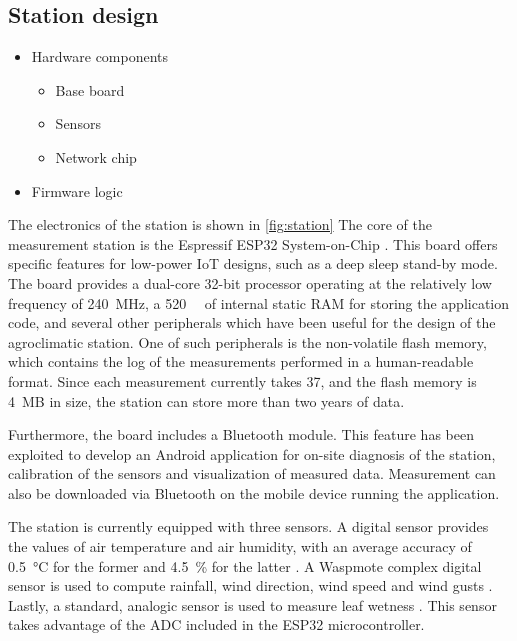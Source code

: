 \documentclass[authoryear,preprint,review,12pt]{elsarticle}
\begin{document}
\subsection{Station design}

\begin{itemize}
    \item Hardware components
    \begin{itemize}
        \item Base board
        \item Sensors
        \item Network chip
    \end{itemize}
    \item Firmware logic
\end{itemize}

The electronics of the station is shown in \cref{fig:station} The core of the measurement station is the Espressif ESP32 System-on-Chip \cite{espressif:sparkfun}. This board offers specific features for low-power IoT designs, such as a deep sleep stand-by mode. The board provides a dual-core 32-bit processor operating at the relatively low frequency of \SI{240}{\mega\hertz}, a \SI{520}{\kilo\byte} of internal static RAM for storing the application code, and several other peripherals which have been useful for the design of the agroclimatic station. One of such peripherals is the non-volatile flash memory, which contains the log of the measurements performed in a human-readable format. Since each measurement currently takes \SI{37}{\byte}, and the flash memory is \SI{4}{MB} in size, the station can store more than two years of data.

Furthermore, the board includes a Bluetooth module. This feature has been exploited to develop an Android application for on-site diagnosis of the station, calibration of the sensors and visualization of measured data. Measurement can also be downloaded via Bluetooth on the mobile device running the application.

The station is currently equipped with three sensors. A digital sensor provides the values of air temperature and air humidity, with an average accuracy of \SI{0.5}{\celsius} for the former and \SI{4,5}{\%} for the latter \cite{sensirion:sht10-temp-hum}. A Waspmote complex digital sensor is used to compute rainfall, wind direction, wind speed and wind gusts \cite{libellium:ws3000}. Lastly, a standard, analogic sensor is used to measure leaf wetness \cite{vaisala:yl83-leaf-wetness}. This sensor takes advantage of the ADC included in the ESP32 microcontroller.
\end{document}
